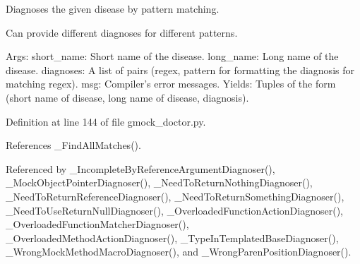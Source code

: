 \begin{DoxyVerb}Diagnoses the given disease by pattern matching.

Can provide different diagnoses for different patterns.

Args:
  short_name: Short name of the disease.
  long_name:  Long name of the disease.
  diagnoses:  A list of pairs (regex, pattern for formatting the diagnosis
              for matching regex).
  msg:        Compiler's error messages.
Yields:
  Tuples of the form
    (short name of disease, long name of disease, diagnosis).
\end{DoxyVerb}
 

Definition at line 144 of file gmock\+\_\+doctor.\+py.



References \+\_\+\+Find\+All\+Matches().



Referenced by \+\_\+\+Incomplete\+By\+Reference\+Argument\+Diagnoser(), \+\_\+\+Mock\+Object\+Pointer\+Diagnoser(), \+\_\+\+Need\+To\+Return\+Nothing\+Diagnoser(), \+\_\+\+Need\+To\+Return\+Reference\+Diagnoser(), \+\_\+\+Need\+To\+Return\+Something\+Diagnoser(), \+\_\+\+Need\+To\+Use\+Return\+Null\+Diagnoser(), \+\_\+\+Overloaded\+Function\+Action\+Diagnoser(), \+\_\+\+Overloaded\+Function\+Matcher\+Diagnoser(), \+\_\+\+Overloaded\+Method\+Action\+Diagnoser(), \+\_\+\+Type\+In\+Templated\+Base\+Diagnoser(), \+\_\+\+Wrong\+Mock\+Method\+Macro\+Diagnoser(), and \+\_\+\+Wrong\+Paren\+Position\+Diagnoser().


